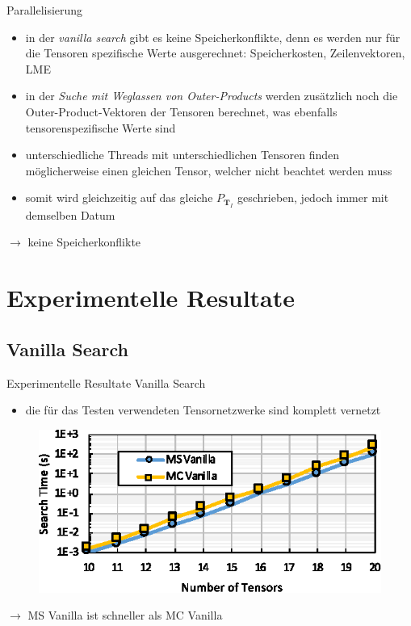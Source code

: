 \documentclass{beamer}
\begin{document}
			\begin{frame}{Parallelisierung}
				\begin{itemize}
					\item in der \textit{vanilla search} gibt es keine Speicherkonflikte, denn es werden nur für die Tensoren spezifische Werte ausgerechnet: Speicherkosten, Zeilenvektoren, LME \pause
					\item in der \textit{Suche mit Weglassen von Outer-Products} werden zusätzlich noch die Outer-Product-Vektoren der Tensoren berechnet, was ebenfalls tensorenspezifische Werte sind
					\item unterschiedliche Threads mit unterschiedlichen Tensoren finden möglicherweise einen gleichen Tensor, welcher nicht beachtet werden muss
					\item somit wird gleichzeitig auf das gleiche $P_{\bm{T}_I}$ geschrieben, jedoch immer mit demselben Datum
				\end{itemize} \pause
				$\rightarrow$ keine Speicherkonflikte
			\end{frame}

		
		\section{Experimentelle Resultate}
		\subsection{Vanilla Search}

		\begin{frame}{Experimentelle Resultate Vanilla Search}
			\begin{itemize}
				\item die für das Testen verwendeten Tensornetzwerke sind komplett vernetzt
			\end{itemize}
			\begin{figure}
				\includegraphics{figure_08}
			\end{figure} \pause
			$\rightarrow$ MS Vanilla ist schneller als MC Vanilla
		\end{frame}
\end{document}
